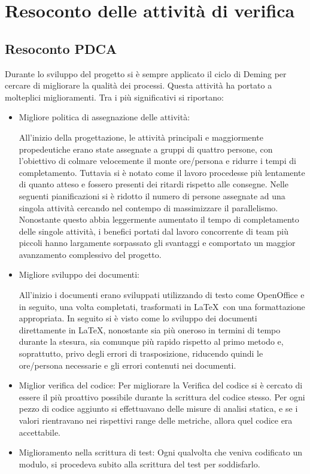 \newpage

\section{Resoconto delle attività di verifica}

\subsection{Resoconto PDCA}

Durante lo sviluppo del progetto si è sempre applicato il ciclo di Deming per cercare di migliorare la qualità dei processi. Questa attività ha portato a molteplici miglioramenti.
Tra i più significativi si riportano:
\begin{itemize}


\item Migliore politica di assegnazione delle attività:

All'inizio della progettazione, le attività principali e maggiormente propedeutiche erano state assegnate a gruppi di quattro persone, con l'obiettivo di colmare velocemente il monte ore/persona e ridurre i tempi di completamento. Tuttavia si è notato come il lavoro procedesse più lentamente di quanto atteso e fossero presenti dei ritardi rispetto alle consegne. Nelle seguenti pianificazioni si è ridotto il numero di persone assegnate ad una singola attività cercando nel contempo di massimizzare il parallelismo. Nonostante questo abbia leggermente aumentato il tempo di completamento delle singole attività, i benefici portati dal lavoro concorrente di team più piccoli hanno largamente sorpassato gli svantaggi e comportato un maggior avanzamento complessivo del progetto.

\item Migliore sviluppo dei documenti:

All'inizio i documenti erano sviluppati utilizzando  di testo come OpenOffice e in seguito, una volta completati, trasformati in \LaTeX\ con una formattazione appropriata.
In seguito si è visto come lo sviluppo dei documenti direttamente in \LaTeX, nonostante sia più oneroso in termini di tempo durante la stesura, sia comunque più rapido rispetto al primo metodo e, soprattutto, privo degli errori di trasposizione, riducendo quindi le ore/persona necessarie e gli errori contenuti nei documenti.

\item Miglior verifica del codice:
Per migliorare la Verifica del codice si è cercato di essere il più proattivo possibile durante la scrittura del codice stesso. Per ogni pezzo di codice aggiunto si effettuavano delle misure di analisi statica, e se i valori rientravano nei rispettivi range delle metriche, allora quel codice era accettabile.

\item Miglioramento nella scrittura di test:
Ogni qualvolta che veniva codificato un modulo, si procedeva subito alla scrittura del test per soddisfarlo.

\end{itemize}


